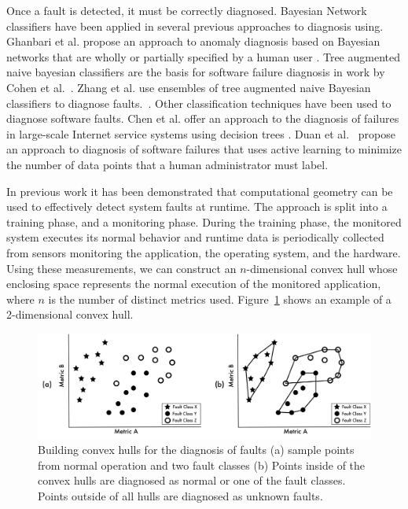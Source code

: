 Once a fault is detected, it must be correctly diagnosed. Bayesian Network classifiers have been applied in several previous approaches to diagnosis using. Ghanbari et al. propose an approach to anomaly diagnosis based on Bayesian networks that are wholly or partially specified by a human user \cite{Ghanbari2008}. Tree augmented naive bayesian classifiers are the basis for software failure diagnosis in work by  Cohen et al.~\cite{Cohen2004}. Zhang et al. use ensembles of tree augmented naive Bayesian classifiers to diagnose faults.~\cite{Zhang2005}. Other classification techniques have been used to diagnose software faults. Chen et al.  offer an approach to the diagnosis of failures in large-scale Internet service systems using decision trees \cite{Chen2004}.  Duan et al.~\cite{Duan} propose an approach to diagnosis of software failures that uses active learning to minimize the number of data points that a human administrator must label.

In previous work it has been demonstrated that computational geometry can be used to effectively detect system faults at runtime\cite{stehle2010,shevertalov2010using}. The approach is split into a training phase, and a monitoring phase. During the training phase, the monitored system executes its normal behavior and runtime data is periodically collected from sensors monitoring the application, the operating system, and the hardware. Using these measurements, we can construct an $n$-dimensional convex hull whose enclosing space represents the normal execution of the monitored application, where $n$ is the number of distinct metrics used. Figure~\ref{fig:class_hulls} shows an example of a 2-dimensional convex hull.

\begin{figure}[tb]
  \centering
  \includegraphics[width=\columnwidth]{images/class_hulls}
  \caption{Building convex hulls for the diagnosis of faults (a) sample points from normal operation and two fault classes (b) Points inside of the convex hulls are diagnosed as normal or one of the fault classes. Points outside of all hulls are diagnosed as unknown faults.}
  \label{fig:class_hulls}
\end{figure}

